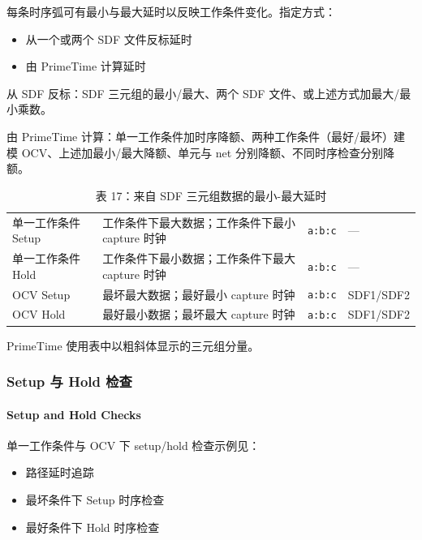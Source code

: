 每条时序弧可有最小与最大延时以反映工作条件变化。指定方式：
\begin{itemize}
  \item 从一个或两个 SDF 文件反标延时
  \item 由 PrimeTime 计算延时
\end{itemize}

从 SDF 反标：SDF 三元组的最小/最大、两个 SDF 文件、或上述方式加最大/最小乘数。

由 PrimeTime 计算：单一工作条件加时序降额、两种工作条件（最好/最坏）建模 OCV、上述加最小/最大降额、单元与 net 分别降额、不同时序检查分别降额。

\begin{table}[htbp]
\centering
\caption{表 17：来自 SDF 三元组数据的最小-最大延时}
\small
\begin{tabular}{|L{2.8cm}|L{4.5cm}|L{2cm}|L{2cm}|}
\hline
{} &  &  &  \\
\hline
单一工作条件 Setup & 工作条件下最大数据；工作条件下最小 capture 时钟 & \texttt{a:b:c} & --- \\
单一工作条件 Hold & 工作条件下最小数据；工作条件下最大 capture 时钟 & \texttt{a:b:c} & --- \\
OCV Setup & 最坏最大数据；最好最小 capture 时钟 & \texttt{a:b:c} & SDF1/SDF2 \\
OCV Hold & 最好最小数据；最坏最大 capture 时钟 & \texttt{a:b:c} & SDF1/SDF2 \\
\hline
\end{tabular}
\end{table}

PrimeTime 使用表中以粗斜体显示的三元组分量。

\subsubsection{Setup 与 Hold 检查}
\paragraph*{Setup and Hold Checks}

单一工作条件与 OCV 下 setup/hold 检查示例见：
\begin{itemize}
  \item 路径延时追踪
  \item 最坏条件下 Setup 时序检查
  \item 最好条件下 Hold 时序检查
\end{itemize}

